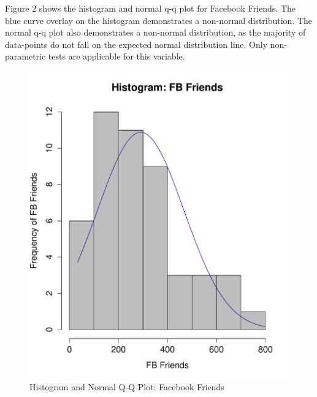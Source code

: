 Figure 2 shows the histogram and normal q-q plot for Facebook Friends. The blue curve overlay on the histogram demonstrates a non-normal distribution. The normal q-q plot also demonstrates a non-normal distribution, as the majority of data-points do not fall on the expected normal distribution line. Only non-parametric tests are applicable for this variable.

\begin{figure}[H]
\caption{Histogram and Normal Q-Q Plot: Facebook Friends}
\centering
\includegraphics[scale=0.35]{./img/hist_fbfriends.pdf}

\end{figure}
